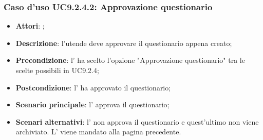 			\subsubsection{Caso d'uso UC9.2.4.2: Approvazione questionario}
			\label{UC9.2.4.2}
			\begin{itemize}
				\item \textbf{Attori}: \uaupro{};
				\item \textbf{Descrizione}: l'utende deve approvare il questionario appena creato;
				\item \textbf{Precondizione}: l'\uaupro{} ha scelto l'opzione "Approvazione questionario" tra le scelte possibili in UC9.2.4; 
				\item \textbf{Postcondizione}: l'\uaupro{} ha approvato il questionario;
				\item \textbf{Scenario principale}: l'\uaupro{} approva il questionario;
				\item \textbf{Scenari alternativi}: l'\uaupro{} non approva il questionario e quest'ultimo non viene archiviato. L'\uaupro{} viene mandato alla pagina precedente.
			\end{itemize}				
	 
